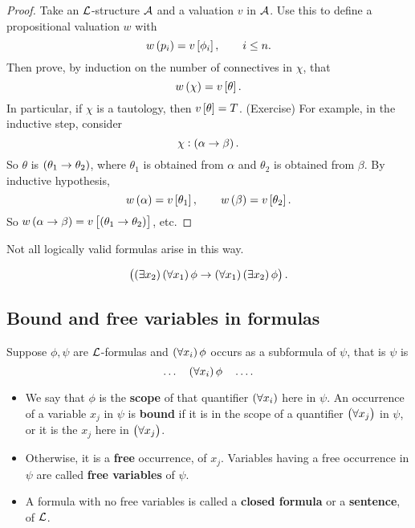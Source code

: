 
\begin{proof}
Take an $ \LL $-structure $ \AA $ and a valuation $ v $ in $ \AA $. Use this to define a propositional valuation $ w $ with
$$ w\br{p_i} = v\sbr{\phi_i}, \qquad i \le n. $$
Then prove, by induction on the number of connectives in $ \chi $, that
$$ w\br{\chi} = v\sbr{\theta}. $$
In particular, if $ \chi $ is a tautology, then $ v\sbr{\theta} = T $. (Exercise) For example, in the inductive step, consider
$$ \chi : \impb{\alpha}{\beta}. $$
So $ \theta $ is $ \impb{\theta_1}{\theta_2} $, where $ \theta_1 $ is obtained from $ \alpha $ and $ \theta_2 $ is obtained from $ \beta $. By inductive hypothesis,
$$ w\br{\alpha} = v\sbr{\theta_1}, \qquad w\br{\beta} = v\sbr{\theta_2}. $$
So $ w\impb{\alpha}{\beta} = v\sbr{\impb{\theta_1}{\theta_2}} $, etc.
\end{proof}

\begin{note*}
Not all logically valid formulas arise in this way.
\end{note*}

\begin{example*}
$$ \impb{\teb{x_2}\fab{x_1}\phi}{\fab{x_1}\teb{x_2}\phi}. $$
\end{example*}

\pagebreak

\subsection{Bound and free variables in formulas}

\begin{definition}
Suppose $ \phi, \psi $ are $ \LL $-formulas and $ \fab{x_i}\phi $ occurs as a subformula of $ \psi $, that is $ \psi $ is
$$ \dots \quad \fab{x_i}\phi \quad \dots. $$
\begin{itemize}
\item We say that $ \phi $ is the \textbf{scope} of that quantifier $ \fab{x_i} $ here in $ \psi $. An occurrence of a variable $ x_j $ in $ \psi $ is \textbf{bound} if it is in the scope of a quantifier $ \fab{x_j} $ in $ \psi $, or it is the $ x_j $ here in $ \fab{x_j} $.
\item Otherwise, it is a \textbf{free} occurrence, of $ x_j $. Variables having a free occurrence in $ \psi $ are called \textbf{free variables} of $ \psi $.
\item A formula with no free variables is called a \textbf{closed formula} or a \textbf{sentence}, of $ \LL $.
\end{itemize}
\end{definition}

